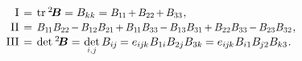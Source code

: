 \begin{otherlanguage}{russian}
\vspace{-0.25em}\begin{equation}\label{invariants:2}
\begin{array}{r@{\hspace{.4em}}c@{\hspace{.4em}}l}
\mathrm{I} & = & \operatorname{tr}\hspace{.1ex} {^2\!\bm{B}} = B_{kk}
= \scalebox{0.92}[0.96]{$B_{1\hspace{-0.12ex}1} \hspace{-0.2ex} + \hspace{-0.1ex} B_{22} \hspace{-0.2ex} + \hspace{-0.1ex} B_{33}$}
\hspace{.1ex} ,
\\[.1em]
%
\mathrm{II} & = & \scalebox{0.92}[0.96]{$B_{1\hspace{-0.12ex}1}B_{22} \hspace{-0.2ex} - \hspace{-0.1ex} B_{12}B_{21} \hspace{-0.2ex} + \hspace{-0.1ex} B_{1\hspace{-0.12ex}1}B_{33} \hspace{-0.2ex} - \hspace{-0.1ex} B_{13}B_{31} \hspace{-0.2ex} + \hspace{-0.1ex} B_{22}B_{33} \hspace{-0.2ex} - \hspace{-0.1ex} B_{23}B_{32}$}
\hspace{.1ex} ,
\\[.1em]
%
\mathrm{III} & = & \operatorname{det} \hspace{.1ex} {^2\!\bm{B}}
= \hspace{.15ex} \underset{\raisebox{.15em}{\scalebox{0.7}{$i$,$\hspace{.15ex}j$}}}{\operatorname{det}} \, B_{i\hspace{-0.1ex}j} \hspace{-0.15ex}
= e_{i\hspace{-0.1ex}j\hspace{-0.1ex}k} \hspace{.1ex} B_{1i} B_{2j} B_{3k} \hspace{-0.1ex}
= e_{i\hspace{-0.1ex}j\hspace{-0.1ex}k} \hspace{.1ex} B_{i1} B_{\hspace{-0.1ex}j2} B_{k3}
\hspace{.1ex} .
\end{array}\end{equation}


\end{otherlanguage}
